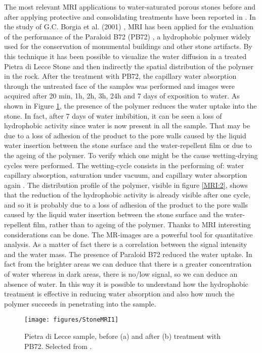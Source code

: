 \documentclass[a4paper,11pt]{report}
\begin{document}
The most relevant MRI applications to water-saturated porous stones before and after applying protective and consolidating treatments have been reported in \cite {settestone, quattrostone, quattro, trestone}. In the study of  G.C. Borgia et al. (2001) \cite{trestone} , MRI has been applied for the evaluation of the performance of the Paraloid B72 (PB72) , a hydrophobic polymer widely used for the conservation of monumental buildings and other stone artifacts. By this technique it has been possible to visualize the water diffusion in a treated Pietra di Lecce Stone and then indirectly the spatial distribution of the polymer in the rock. After the treatment with PB72, the capillary water absorption through the untreated face of the samples was performed and images were acquired after 20 min, 1h, 2h, 3h, 24h and 7 days of exposition to water. As shown in Figure \ref{MRI:1}, the presence of the polymer reduces the water uptake into the stone. In fact, after 7 days of water imbibition, it can be seen a loss of hydrophobic activity since water is now present in all the sample. That may be due to a loss of adhesion of the product to the pore walls caused by the liquid water insertion between the stone surface and the water-repellent film or due to the ageing of the polymer. To verify which one might be the cause wetting-drying cycles were performed. 
The wetting-cycle consists in the performing of: water capillary absorption, saturation under vacuum, and capillary water absorption again . The distribution profile of the polymer, visible in figure \ref{MRI:2}, shows that the reduction of the hydrophobic activity is already visible after one cycle, and so it is probably due to a loss of adhesion of the product to the pore walls caused by the liquid water insertion between the stone surface and the water-repellent film, rather than to ageing of the polymer\cite{trestone}.
Thanks to MRI interesting considerations can be done. The MR-images are a powerful tool for quantitative analysis. As a matter of fact there is a correlation between the signal intensity and the water mass. The presence of Paraloid B72 reduced the water uptake. In fact from the brighter areas we can deduce that there is a greater concentration of water whereas in dark areas, there is no/low signal, so we can deduce an absence of water. In this way it is possible to understand how the hydrophobic treatment is effective in reducing water absorption and also how much the polymer succeeds in penetrating into the sample.


\begin{figure}[h]
\centering
\texttt{[image: figures/StoneMRI1]}
\caption{ Pietra di Lecce sample, before (a) and after (b) treatment with PB72. Selected from \cite{trestone}.}\label{MRI:1}

\end{figure}
\end{document}
